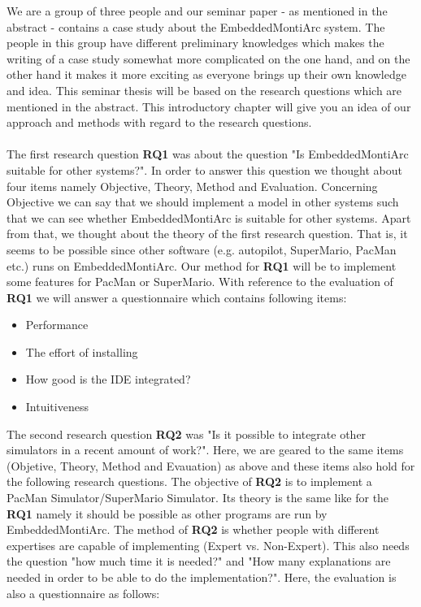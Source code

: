 We are a group of three people and our seminar paper - as mentioned in the abstract - contains a case study about the EmbeddedMontiArc system. The people in this group have different preliminary knowledges which makes the writing of a case study somewhat more complicated on the one hand, and on the other hand it makes it more exciting as everyone brings up their own knowledge and idea. This seminar thesis will be based on the research questions which are mentioned in the abstract. This introductory chapter will give you an idea of our approach and methods with regard to the research questions.
\\ \\
The first research question \textbf{RQ1} was about the question "Is EmbeddedMontiArc suitable for other systems?". In order to answer this question we thought about four items namely Objective, Theory, Method and Evaluation. Concerning Objective we can say that we should implement a model in other systems such that we can see whether EmbeddedMontiArc is suitable for other systems. Apart from that, we thought about the theory of the first research question. That is, it seems to be possible since other software (e.g. autopilot, SuperMario, PacMan etc.) runs on EmbeddedMontiArc. Our method for \textbf{RQ1} will be to implement some features for PacMan or SuperMario. With reference to the evaluation of \textbf{RQ1} we will answer a questionnaire which contains following items:
\begin{itemize}
	\item Performance
	\item The effort of installing
	\item How good is the IDE integrated?
	\item Intuitiveness
\end{itemize}
The second research question \textbf{RQ2} was "Is it possible to integrate other simulators in a recent amount of work?". Here, we are geared to the same items (Objetive, Theory, Method and Evauation) as above and these items also hold for the following research questions. The objective of \textbf{RQ2} is to implement a PacMan Simulator/SuperMario Simulator. Its theory is the same like for the \textbf{RQ1} namely it should be possible as other programs are run by EmbeddedMontiArc. The method of \textbf{RQ2} is whether people with different expertises are capable of implementing (Expert vs. Non-Expert). This also needs the question "how much time it is needed?" and "How many explanations are needed in order to be able to do the implementation?". Here, the evaluation is also a questionnaire as follows:
